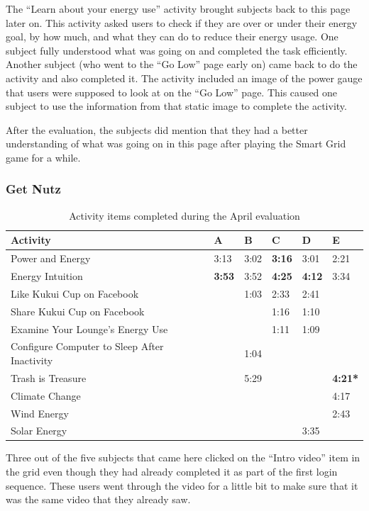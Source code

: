 The ``Learn about your energy use'' activity brought subjects back to this page later on. This activity asked users to check if they are over or under their energy goal, by how much, and what they can do to reduce their energy usage. One subject fully understood what was going on and completed the task efficiently. Another subject (who went to the ``Go Low'' page early on) came back to do the activity and also completed it. The activity included an image of the power gauge that users were supposed to look at on the ``Go Low'' page. This caused one subject to use the information from that static image to complete the activity.

After the evaluation, the subjects did mention that they had a better understanding of what was going on in this page after playing the Smart Grid game for a while.

\subsubsection{Get Nutz}

\begin{table}[t]
	\begin{tabular}{| l || p{1cm} | p{1cm} | p{1cm} | p{1cm} | p{1cm} |}
		\hline
		Activity & A & B & C & D & E \\
		\hline
		Power and Energy & 3:13 & 3:02 & \bf{3:16} & 3:01 & 2:21 \\
    Energy Intuition & \bf{3:53} & 3:52 & \bf{4:25} & \bf{4:12} & 3:34 \\
    Like Kukui Cup on Facebook & & 1:03 & 2:33 & 2:41 & \\
    Share Kukui Cup on Facebook & & & 1:16 & 1:10 & \\
    Examine Your Lounge's Energy Use & & & 1:11 & 1:09 & \\
    Configure Computer to Sleep After Inactivity & & 1:04 & & &  \\
    Trash is Treasure & & 5:29 & & & \bf{4:21}* \\
    Climate Change & & & & & 4:17 \\
    Wind Energy & & & & & 2:43 \\
    Solar Energy & & & & 3:35 & \\
		\hline
	\end{tabular}
	\caption{Activity items completed during the April evaluation}
	\label{table:april-activities}
\end{table}

Three out of the five subjects that came here clicked on the ``Intro video'' item in the grid even though they had already completed it as part of the first login sequence. These users went through the video for a little bit to make sure that it was the same video that they already saw.


